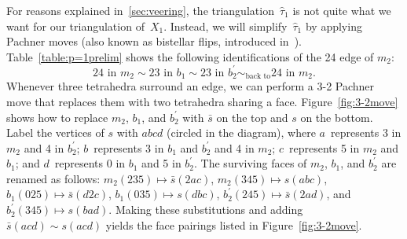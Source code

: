 \documentclass[reqno]{amsart}
\theoremstyle{plain}
\theoremstyle{definition}
\begin{document}
For reasons explained in~\ref{sec:veering}, the triangulation~$\hat{\tau}_1$ is not quite what we want for our triangulation of~$X_{1}$.  Instead, we  will simplify~$\hat{\tau}_1$ by applying Pachner moves (also known as bistellar flips, introduced in~\cite{Pachner}).  Table~\ref{table:p=1prelim} shows the following identifications of the 24 edge of $m_2$:
$$
24 \text{ in } m_2\sim 23 \text{ in } b_1\sim 23 \text{ in } b_2^\prime \sim_{\text{back to}}24 \text{ in } m_2.
$$
Whenever three tetrahedra surround an edge, we can perform a 3-2 Pachner move that replaces them with two tetrahedra sharing a face.  Figure~\ref{fig:3-2move} shows how to replace $m_2$, $b_1$, and $b_2^\prime$ with $\bar s$ on the top and $s$ on the bottom.  Label the vertices of $s$ with $abcd$ (circled in the diagram), where 
$a$~represents 3 in $m_2$ and 4 in $b_2^\prime$; 
$b$~represents 3 in $b_1$ and $b_2^\prime$ and 4 in $m_2$; 
$c$~represents 5 in $m_2$ and $b_1$; and 
$d$~represents 0 in $b_1$ and 5 in $b_2^\prime$.
The surviving faces of $m_2$, $b_1$, and $b_2^\prime$ are renamed as follows:
$m_2(235) \mapsto \bar s(2ac)$,
$m_2(345) \mapsto s(abc)$,
$b_1(025) \mapsto \bar s(d2c)$,
$b_1(035)  \mapsto s(dbc)$,
$b_2^\prime(245) \mapsto \bar s(2ad)$, and
$b_2^\prime(345) \mapsto s(bad)$.  
Making these substitutions and adding $\bar s(acd)\sim s(acd)$ yields the face pairings listed in Figure~\ref{fig:3-2move}.
\end{document}
